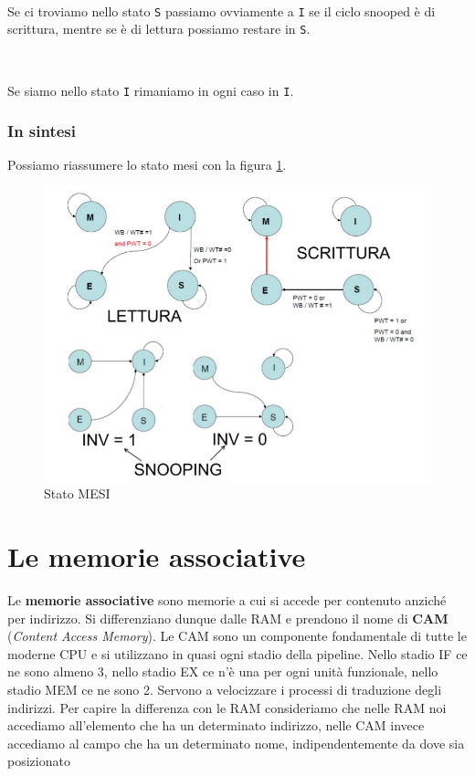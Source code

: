 \documentclass[11pt]{book}
\begin{document}
\

Se ci troviamo nello stato \texttt{S} passiamo ovviamente a \texttt{I}
se il ciclo snooped \`e di scrittura, mentre se \`e di lettura
possiamo restare in \texttt{S}.

\

Se siamo nello stato \texttt{I} rimaniamo in ogni caso in \texttt{I}.

\subsection*{In sintesi}

Possiamo riassumere lo stato mesi con la figura \ref{mesi}.

\begin{figure}[h]
  \centering
  \includegraphics[width=\textwidth]{images/mesi.png}
  \caption{Stato MESI}
  \label{mesi}
\end{figure}

\appendix
\chapter{Le memorie associative}
\label{chap:memorieassociative}

Le {\bf memorie associative} sono memorie a cui si accede per
contenuto anzich\'e per indirizzo. Si differenziano dunque dalle RAM e
prendono il nome di {\bf CAM} ({\em Content Access Memory}). Le CAM
sono un componente fondamentale di tutte le moderne CPU e si
utilizzano in quasi ogni stadio della pipeline. Nello stadio IF ce ne
sono almeno 3, nello stadio EX ce n'\`e una per ogni unit\`a
funzionale, nello stadio MEM ce ne sono 2. Servono a velocizzare i
processi di traduzione degli indirizzi.  Per capire la differenza con
le RAM consideriamo che nelle RAM noi accediamo all'elemento che ha un
determinato indirizzo, nelle CAM invece accediamo al campo che ha un
determinato nome, indipendentemente da dove sia posizionato
\end{document}
